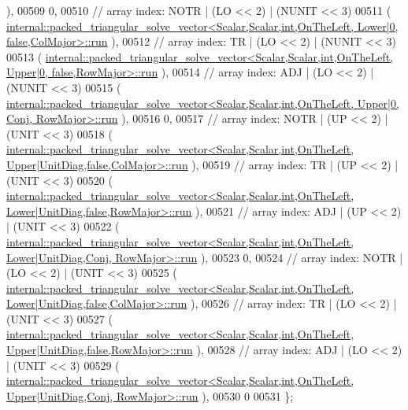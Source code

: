 \begin{DoxyCode}
      ),
00509     0,
00510     \textcolor{comment}{// array index: NOTR  | (LO << 2) | (NUNIT << 3)}
00511     (
      \hyperlink{structinternal_1_1packed__triangular__solve__vector}{internal::packed\_triangular\_solve\_vector<Scalar,Scalar,int,OnTheLeft, Lower|0,       false,ColMajor>::run}
      ),
00512     \textcolor{comment}{// array index: TR    | (LO << 2) | (NUNIT << 3)}
00513     (
      \hyperlink{structinternal_1_1packed__triangular__solve__vector}{internal::packed\_triangular\_solve\_vector<Scalar,Scalar,int,OnTheLeft, Upper|0,       false,RowMajor>::run}
      ),
00514     \textcolor{comment}{// array index: ADJ   | (LO << 2) | (NUNIT << 3)}
00515     (
      \hyperlink{structinternal_1_1packed__triangular__solve__vector}{internal::packed\_triangular\_solve\_vector<Scalar,Scalar,int,OnTheLeft, Upper|0,       Conj, RowMajor>::run}
      ),
00516     0,
00517     \textcolor{comment}{// array index: NOTR  | (UP << 2) | (UNIT  << 3)}
00518     (
      \hyperlink{structinternal_1_1packed__triangular__solve__vector}{internal::packed\_triangular\_solve\_vector<Scalar,Scalar,int,OnTheLeft, Upper|UnitDiag,false,ColMajor>::run}
      ),
00519     \textcolor{comment}{// array index: TR    | (UP << 2) | (UNIT  << 3)}
00520     (
      \hyperlink{structinternal_1_1packed__triangular__solve__vector}{internal::packed\_triangular\_solve\_vector<Scalar,Scalar,int,OnTheLeft, Lower|UnitDiag,false,RowMajor>::run}
      ),
00521     \textcolor{comment}{// array index: ADJ   | (UP << 2) | (UNIT  << 3)}
00522     (
      \hyperlink{structinternal_1_1packed__triangular__solve__vector}{internal::packed\_triangular\_solve\_vector<Scalar,Scalar,int,OnTheLeft, Lower|UnitDiag,Conj, RowMajor>::run}
      ),
00523     0,
00524     \textcolor{comment}{// array index: NOTR  | (LO << 2) | (UNIT  << 3)}
00525     (
      \hyperlink{structinternal_1_1packed__triangular__solve__vector}{internal::packed\_triangular\_solve\_vector<Scalar,Scalar,int,OnTheLeft, Lower|UnitDiag,false,ColMajor>::run}
      ),
00526     \textcolor{comment}{// array index: TR    | (LO << 2) | (UNIT  << 3)}
00527     (
      \hyperlink{structinternal_1_1packed__triangular__solve__vector}{internal::packed\_triangular\_solve\_vector<Scalar,Scalar,int,OnTheLeft, Upper|UnitDiag,false,RowMajor>::run}
      ),
00528     \textcolor{comment}{// array index: ADJ   | (LO << 2) | (UNIT  << 3)}
00529     (
      \hyperlink{structinternal_1_1packed__triangular__solve__vector}{internal::packed\_triangular\_solve\_vector<Scalar,Scalar,int,OnTheLeft, Upper|UnitDiag,Conj, RowMajor>::run}
      ),
00530     0
00531   \};

\end{DoxyCode}
